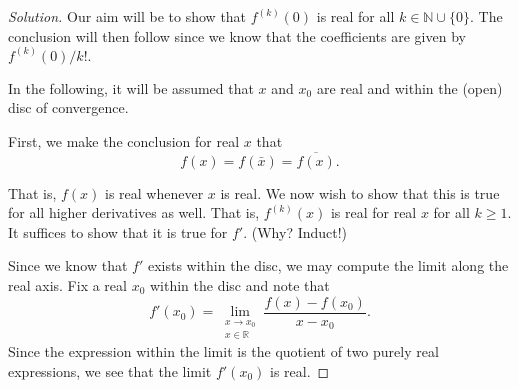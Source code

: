 \documentclass[12pt]{article}
\theoremstyle{definition}
\newenvironment{soln}{\begin{proof}[Solution]}{\end{proof}}
\begin{document}
\begin{enumerate}[leftmargin=*]
\begin{soln}
		Our aim will be to show that $f^{(k)}(0)$ is real for all $k \in \mathbb{N}\cup\{0\}.$ The conclusion will then follow since we know that the coefficients are given by $f^{(k)}(0)/k!.$

		In the following, it will be assumed that $x$ and $x_0$ are real and within the (open) disc of convergence.

		First, we make the conclusion for real $x$ that
		\begin{equation*} 
			f(x) = f(\bar{x}) = \overline{f(x)}.
		\end{equation*}

		That is, $f(x)$ is real whenever $x$ is real. We now wish to show that this is true for all higher derivatives as well. That is, $f^{(k)}(x)$ is real for real $x$ for all $k \ge 1.$ It suffices to show that it is true for $f'.$ \hfill (Why? Induct!)

		Since we know that $f'$ exists within the disc, we may compute the limit along the real axis. Fix a real $x_0$ within the disc and note that
		\begin{equation*} 
			f'(x_0) = \lim_{\substack{x\to x_0\\x\in\mathbb{R}}}\dfrac{f(x) - f(x_0)}{x - x_0}.
		\end{equation*}
		Since the expression within the limit is the quotient of two purely real expressions, we see that the limit $f'(x_0)$ is real.


\end{soln}
\end{enumerate}
\end{document}
